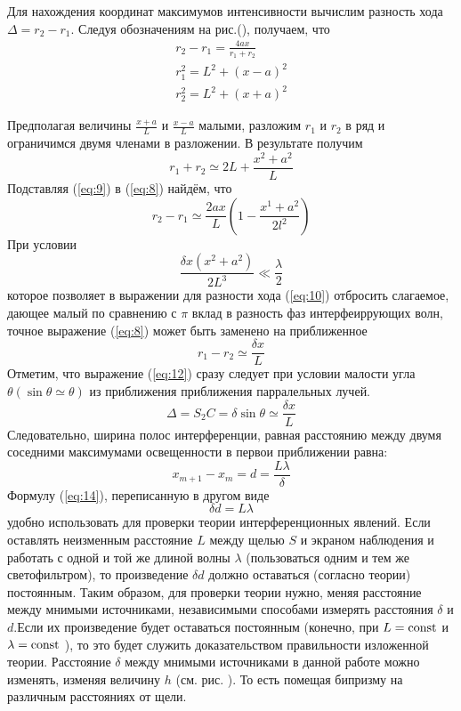 Для нахождения координат максимумов интенсивности вычислим разность хода $\Delta=r_2-r_1$. Следуя обозначениям на рис.(), получаем, что 
\begin{gather}
	\label{eq:8}
	r_2-r_1=\frac{4ax}{r_1+r_2} \\ \nonumber
	r_1^2=L^2+(x-a)^2 \\ \nonumber
	r_2^2=L^2+(x+a)^2 \nonumber
\end{gather}


Предполагая величины $\frac{x+a}{L}$ и $\frac{x-a}{L}$ малыми, разложим $r_1$ и $r_2$ в ряд и ограничимся двумя членами в разложении. В результате получим
\begin{equation}
	\label{eq:9}
	r_1+r_2\simeq 2L +\frac{x^2+a^2}{L} 
\end{equation}
Подставляя (\ref{eq:9}) в (\ref{eq:8}) найдём, что 
\begin{equation}
	r_2-r_1\simeq \frac{2ax}{L}\left(1-\frac{x^1+a^2}{2l^2} \right) \label{eq:10}
\end{equation}
При условии 
\begin{equation}
	\frac{\delta x(x^2+a^2)}{2L^3}\ll\frac{\lambda}{2}
\end{equation}
которое позволяет в выражении для разности хода (\ref{eq:10}) отбросить слагаемое, дающее малый по сравнению с $\pi$ вклад в разность фаз интерфеиррующих волн, точное выражение (\ref{eq:8}) может быть заменено на приближенное
\begin{equation}
 	r_1-r_2\simeq\frac{\delta x}{L} \label{eq:12}
 \end{equation} 
 Отметим, что выражение (\ref{eq:12}) сразу следует при условии малости угла 
 $\theta (\sin{\theta}\simeq\theta)$ из приближения приближения парралельных лучей. 
 \begin{equation}
 	\Delta=S_2C=\delta\sin{\theta}\simeq\frac{\delta x}{L}
 \end{equation}
 Следовательно, ширина полос интерференции, равная расстоянию между двумя соседними максимумами освещенности в первои приближении равна:
 \begin{equation}
 	x_{m+1}-x_m=d=\frac{L\lambda}{\delta} \label{eq:14}
 \end{equation}
 Формулу (\ref{eq:14}), переписанную в другом виде
 \begin{equation}
 	\delta d=L\lambda
 \end{equation}
 удобно использовать для проверки теории интерференционных явлений. Если оставлять неизменным расстояние $L$ между щелью $S$ и экраном наблюдения и работать с одной и той же длиной волны $\lambda$ (пользоваться одним и тем же светофильтром), то произведение $\delta d$ должно оставаться (согласно теории) постоянным. Таким образом, для проверки теории нужно, меняя расстояние между мнимыми источниками, независимыми способами измерять расстояния $\delta$ и $d$.Если их произведение будет оставаться постоянным (конечно, при $L= \text{\rmfamily\upshape const}$ и $\lambda=\text{\rmfamily\upshape const}$ ), то это будет служить доказательством правильности изложенной теории. Расстояние $\delta$ между мнимыми источниками в данной работе можно изменять, изменяя величину $h$ (см. рис. ). То есть помещая бипризму на различным расстояниях от щели.
